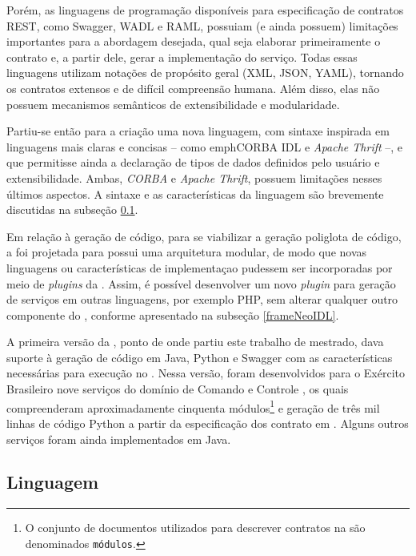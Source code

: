Porém, as linguagens de programação disponíveis para especificação de
contratos REST, como Swagger\cite{swaggerSite}, WADL\cite{hadley2006web} e
RAML\cite{RAML}, possuiam (e ainda possuem) limitações importantes para a
abordagem desejada, qual seja elaborar primeiramente o contrato e, a
partir dele, gerar a implementação do serviço. Todas essas linguagens utilizam
notações de propósito geral (XML\cite{XML}, JSON\cite{JSon}, YAML\cite{YAML}),
tornando os contratos extensos e de difícil compreensão humana. Além disso,
elas não possuem mecanismos semânticos de extensibilidade e modularidade.

Partiu-se então para a criação uma nova linguagem, com sintaxe
inspirada em linguagens mais claras e concisas -- como emph{CORBA
IDL}\texttrademark \cite{corba} e \emph{Apache
Thrift}\texttrademark\cite{thrift} --, e que permitisse ainda a declaração de
tipos de dados definidos pelo usuário e extensibilidade. Ambas, \emph{CORBA} e
\emph{Apache Thrift}, possuem limitações nesses últimos aspectos. A sintaxe e as
características da linguagem \neoidl{} são brevemente discutidas na subseção
\ref{linguagemNeoIDL}.

Em relação à geração de código, para se viabilizar a geração poliglota de
código, a \neoidl{} foi projetada para possui uma arquitetura modular, de modo que novas linguagens ou características de implementaçao
pudessem ser incorporadas por meio de \textit{plugins} da \neoidl{}. Assim, é
possível desenvolver um novo \textit{plugin} para geração de serviços em outras
linguagens, por exemplo PHP, sem alterar qualquer outro componente do \framework,
conforme apresentado na subseção \ref{frameNeoIDL}.

A primeira versão da \neoidl{}, ponto de onde partiu este trabalho de mestrado,
dava suporte à geração de código em Java, Python e Swagger com as
características necessárias para execução no \neocortex{}. Nessa versão, foram
desenvolvidos para o Exército Brasileiro nove serviços do domínio de Comando e
Controle \cite{david:commandControl}, os quais compreenderam aproximadamente
cinquenta módulos\footnote{O conjunto de documentos
utilizados para descrever contratos na \neoidl{} são denominados
\texttt{módulos}.} e geração de três mil linhas de código Python a partir
da especificação dos contrato em \neoidl{}. Alguns outros serviços foram
ainda implementados em Java.



\subsection{Linguagem}
\label{linguagemNeoIDL}
\vspace{-6mm}

